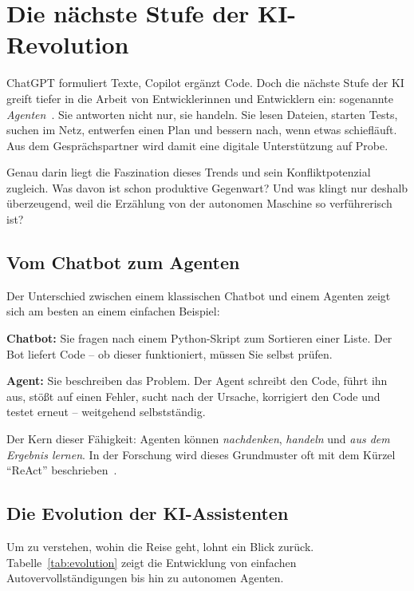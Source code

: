 
\section{Die nächste Stufe der KI-Revolution}

ChatGPT formuliert Texte, Copilot ergänzt Code. Doch die nächste Stufe der KI greift tiefer in die Arbeit von Entwicklerinnen und Entwicklern ein: sogenannte \emph{Agenten}~\cite{wang2023survey}. Sie antworten nicht nur, sie handeln. Sie lesen Dateien, starten Tests, suchen im Netz, entwerfen einen Plan und bessern nach, wenn etwas schiefläuft. Aus dem Gesprächspartner wird damit eine digitale Unterstützung auf Probe.

Genau darin liegt die Faszination dieses Trends und sein Konfliktpotenzial zugleich. Was davon ist schon produktive Gegenwart? Und was klingt nur deshalb überzeugend, weil die Erzählung von der autonomen Maschine so verführerisch ist?

\subsection{Vom Chatbot zum Agenten}

Der Unterschied zwischen einem klassischen Chatbot und einem Agenten zeigt sich am besten an einem einfachen Beispiel:

\textbf{Chatbot:} Sie fragen nach einem Python-Skript zum Sortieren einer Liste. Der Bot liefert Code – ob dieser funktioniert, müssen Sie selbst prüfen.

\textbf{Agent:} Sie beschreiben das Problem. Der Agent schreibt den Code, führt ihn aus, stößt auf einen Fehler, sucht nach der Ursache, korrigiert den Code und testet erneut – weitgehend selbstständig.

Der Kern dieser Fähigkeit: Agenten können \emph{nachdenken}, \emph{handeln} und \emph{aus dem Ergebnis lernen}. In der Forschung wird dieses Grundmuster oft mit dem Kürzel \enquote{ReAct} beschrieben~\cite{yao2023react}.


\subsection{Die Evolution der KI-Assistenten}

Um zu verstehen, wohin die Reise geht, lohnt ein Blick zurück. Tabelle~\ref{tab:evolution} zeigt die Entwicklung von einfachen Autovervollständigungen bis hin zu autonomen Agenten.

